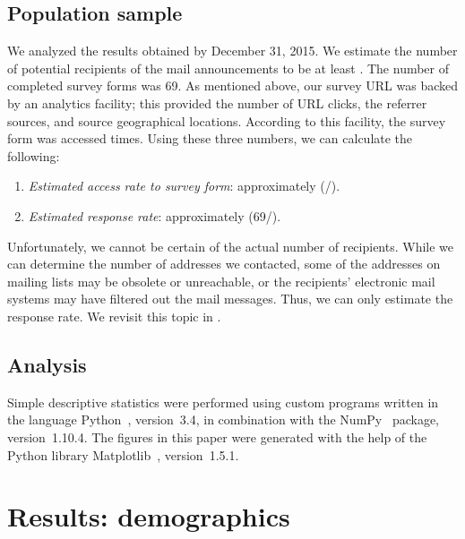 \documentclass{casicswhitepaper}
\newcommand{\totalRespondents}{69\xspace}
\begin{document}
\subsection{Population sample}
\label{population-sample}

We analyzed the results obtained by December 31, 2015.  We estimate the number of potential recipients of the mail announcements to be at least \totalPotentialRecipients.  The number of completed survey forms was \totalRespondents.  As mentioned above, our survey URL was backed by an analytics facility; this provided the number of URL clicks, the referrer sources, and source geographical locations.  According to this facility, the survey form was accessed \totalClicks times.  Using these three numbers, we can calculate the following:

\begin{enumerate}[itemsep=-0.5ex]

\item \emph{Estimated access rate to survey form}: approximately \accessRate  (\totalClicks/\totalPotentialRecipients).

\item \emph{Estimated response rate}: approximately \populationResponseRate (\totalRespondents/\totalPotentialRecipients).

\end{enumerate}

Unfortunately, we cannot be certain of the actual number of recipients.  While we can determine the number of addresses we contacted, some of the addresses on mailing lists may be obsolete or unreachable, or the recipients' electronic mail systems may have filtered out the mail messages.  Thus, we can only estimate the response rate.  We revisit this topic in .


\subsection{Analysis}

Simple descriptive statistics were performed using custom programs written in the language Python~\cite{vanRossum1991interactively, perez2011python}, version~3.4, in combination with the NumPy~\cite{vanderwalt2011numpy} package, version~1.10.4.  The figures in this paper were generated with the help of the Python library Matplotlib~\cite{hunter2007matplotlib}, version~1.5.1.


\clearpage

\section{Results: demographics}
\label{demographics}
\end{document}
